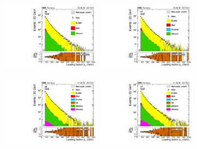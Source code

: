 \begin{figure}[htbp]
  \centering

  \includegraphics[width=0.45\textwidth]{figures/2016/AfterNormSFAndZPtReweighting_Lepton_0_Pt_HNWR_SingleElectron_OnZ.pdf}
  \hspace{0.01\textwidth}
  \includegraphics[width=0.45\textwidth]{figures/2016/AfterNormSFAndZPtReweighting_Lepton_0_Pt_HNWR_SingleMuon_OnZ.pdf}
  \vspace{0.01\textwidth}

  \includegraphics[width=0.45\textwidth]{figures/2017/AfterNormSFAndZPtReweighting_Lepton_0_Pt_HNWR_SingleElectron_OnZ.pdf}
  \hspace{0.01\textwidth}
  \includegraphics[width=0.45\textwidth]{figures/2017/AfterNormSFAndZPtReweighting_Lepton_0_Pt_HNWR_SingleMuon_OnZ.pdf}
  \vspace{0.01\textwidth}
   

\end{figure}
